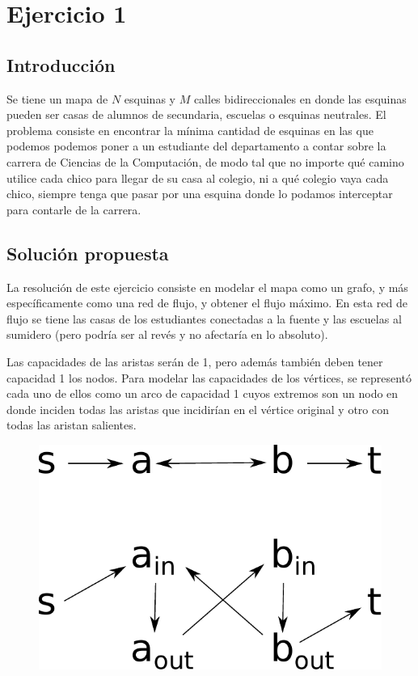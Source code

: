 \section{Ejercicio 1}

\subsection{Introducción}

Se tiene un mapa de $N$ esquinas y $M$ calles bidireccionales en donde las esquinas pueden ser casas de alumnos de secundaria, escuelas o esquinas neutrales. El problema consiste en encontrar la mínima cantidad de esquinas en las que podemos podemos poner a un estudiante del departamento a contar sobre la carrera de Ciencias de la Computación, de modo tal que no importe qué camino utilice cada chico para llegar de su casa al colegio, ni a qué colegio vaya cada chico, siempre tenga que pasar por una esquina donde lo podamos interceptar para contarle de la carrera.

\subsection{Solución propuesta}

La resolución de este ejercicio consiste en modelar el mapa como un grafo, y más específicamente como una red de flujo, y obtener el flujo máximo. En esta red de flujo se tiene las casas de los estudiantes conectadas a la fuente y las escuelas al sumidero (pero podría ser al revés y no afectaría en lo absoluto).

Las capacidades de las aristas serán de 1, pero además también deben tener capacidad 1 los nodos. Para modelar las capacidades de los vértices, se representó cada uno de ellos como un arco de capacidad 1 cuyos extremos son un nodo en donde inciden todas las aristas que incidirían en el vértice original y otro con todas las aristan salientes.

\begin{figure}[H]
\centering
\includegraphics[scale=0.6]{imagenes/ej1_capacidades_nodos.pdf}
\end{figure}

